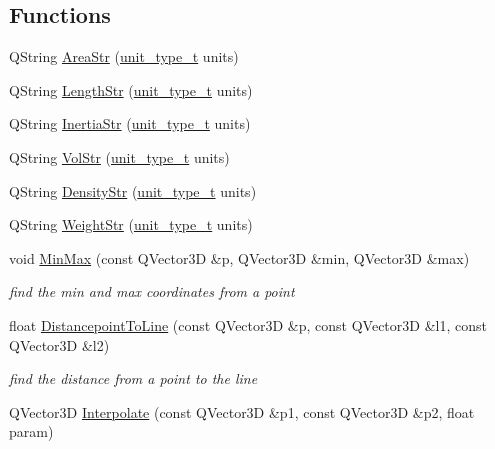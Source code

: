\subsection*{Functions}
\begin{DoxyCompactItemize}
\item 
Q\-String \hyperlink{namespaceShipCAD_a2d7cf2fbcca4bd1dd75fd9ceb4ff0fa9}{Area\-Str} (\hyperlink{namespaceShipCAD_ac6a7a28b4b063771afae92decb602da5}{unit\-\_\-type\-\_\-t} units)
\item 
Q\-String \hyperlink{namespaceShipCAD_aef3e2265fc686fbe6b50b081dcc4e6ff}{Length\-Str} (\hyperlink{namespaceShipCAD_ac6a7a28b4b063771afae92decb602da5}{unit\-\_\-type\-\_\-t} units)
\item 
Q\-String \hyperlink{namespaceShipCAD_a01d1e42109b5645919c004f6d7a30b68}{Inertia\-Str} (\hyperlink{namespaceShipCAD_ac6a7a28b4b063771afae92decb602da5}{unit\-\_\-type\-\_\-t} units)
\item 
Q\-String \hyperlink{namespaceShipCAD_a0758fd8275aafe6ad813d2a361281bf2}{Vol\-Str} (\hyperlink{namespaceShipCAD_ac6a7a28b4b063771afae92decb602da5}{unit\-\_\-type\-\_\-t} units)
\item 
Q\-String \hyperlink{namespaceShipCAD_af977e4008c66d1a323d105f27622991b}{Density\-Str} (\hyperlink{namespaceShipCAD_ac6a7a28b4b063771afae92decb602da5}{unit\-\_\-type\-\_\-t} units)
\item 
Q\-String \hyperlink{namespaceShipCAD_a62749df66958d1389c3cc6f6f03d42fb}{Weight\-Str} (\hyperlink{namespaceShipCAD_ac6a7a28b4b063771afae92decb602da5}{unit\-\_\-type\-\_\-t} units)
\item 
void \hyperlink{namespaceShipCAD_aa5d3fc63603d716d3e24244049e1e510}{Min\-Max} (const Q\-Vector3\-D \&p, Q\-Vector3\-D \&min, Q\-Vector3\-D \&max)
\begin{DoxyCompactList}\small\item\em find the min and max coordinates from a point \end{DoxyCompactList}\item 
float \hyperlink{namespaceShipCAD_a69361fa79b1f818e21306f6266ee45d3}{Distancepoint\-To\-Line} (const Q\-Vector3\-D \&p, const Q\-Vector3\-D \&l1, const Q\-Vector3\-D \&l2)
\begin{DoxyCompactList}\small\item\em find the distance from a point to the line \end{DoxyCompactList}\item 
Q\-Vector3\-D \hyperlink{namespaceShipCAD_a83f7c2b40959a0d02a2cc1085b0d07ee}{Interpolate} (const Q\-Vector3\-D \&p1, const Q\-Vector3\-D \&p2, float param)

\end{DoxyCompactItemize}
